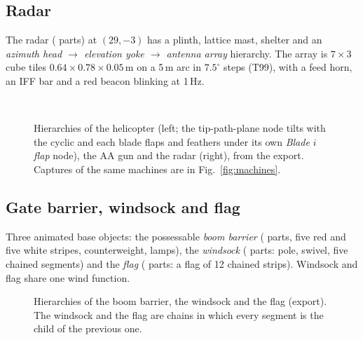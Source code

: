 \subsection{Radar}
The radar (\partsRadar{} parts) at $(29,-3)$ has a plinth, lattice mast, shelter and an
\emph{azimuth head $\to$ elevation yoke $\to$ antenna array} hierarchy. The array is $7\times3$ cube tiles
$0.64\times0.78\times0.05$\,m on a 5\,m arc in $7.5^\circ$ steps (T99), with a feed horn, an IFF bar and a red beacon blinking at 1\,Hz.

\begin{figure}[h]
\centering
\begin{minipage}[t]{0.55\linewidth}\vspace{0pt}\end{minipage}\hfill
\begin{minipage}[t]{0.42\linewidth}\vspace{0pt}\\[3mm]\end{minipage}
\caption{Hierarchies of the helicopter (left; the tip-path-plane node tilts with the cyclic and each blade flaps and feathers under its own \emph{Blade $i$ flap} node), the AA gun and
the radar (right), from the export. Captures of the same machines are in Fig.~\ref{fig:machines}.}
\label{fig:tree-air}
\end{figure}

\subsection{Gate barrier, windsock and flag}
Three animated base objects: the possessable \emph{boom barrier} (\partsBarrier{} parts, five red and five white stripes, counterweight, lamps), the \emph{windsock} (\partsWindsock{} parts: pole, swivel, five chained
segments) and the \emph{flag} (\partsFlag{} parts: a flag of 12 chained strips). Windsock and flag share one wind function.

\begin{figure}[h]
\centering
\begin{minipage}[t]{0.32\linewidth}\vspace{0pt}\end{minipage}\hfill
\begin{minipage}[t]{0.32\linewidth}\vspace{0pt}\end{minipage}\hfill
\begin{minipage}[t]{0.32\linewidth}\vspace{0pt}\end{minipage}
\caption{Hierarchies of the boom barrier, the windsock and the flag (export). The windsock and the flag are chains in
which every segment is the child of the previous one.}
\end{figure}


